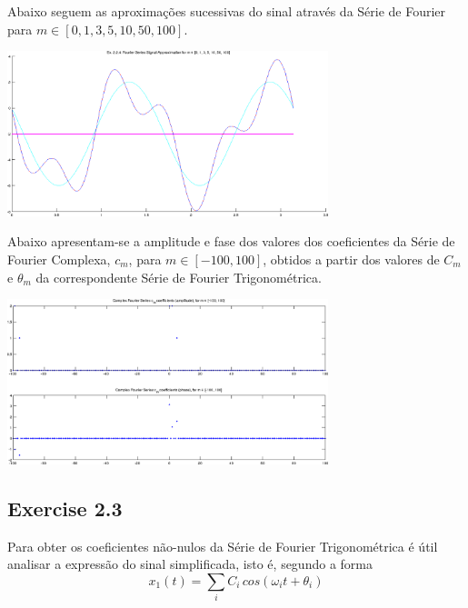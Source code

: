 \documentclass[a4paper]{article}
\begin{document}
\clearpage
\noindent Abaixo seguem as aproximações sucessivas do sinal através da Série de Fourier para $m \in [0, 1, 3, 5, 10, 50, 100]$.
\begin{center}
	\includegraphics[width=0.70\textwidth]{images/ex2_2_4_approx.png}
	\label{fig:ex2_2_4_approx}
\end{center}

\noindent Abaixo apresentam-se a amplitude e fase dos valores dos coeficientes da Série de Fourier Complexa, $c_m$, para $m \in [-100, 100]$, obtidos a partir dos valores de $C_m$ e $\theta_m$ da correspondente Série de Fourier Trigonométrica.
\begin{center}
	\includegraphics[width=0.70\textwidth]{images/ex2_2_4_complex_cm.png}
	\label{fig:ex2_2_4_complex_cm}
\end{center}

\clearpage
\subsection{Exercise 2.3}
\label{subsec:ex_2_3}
\noindent Para obter os coeficientes não-nulos da Série de Fourier Trigonométrica é útil analisar a expressão do sinal simplificada, isto é, segundo a forma
\begin{equation}
x_{1}(t) = \sum_{i} C_{i} \, cos(\omega_{i} t + \theta_{i})
\end{equation}
\end{document}
